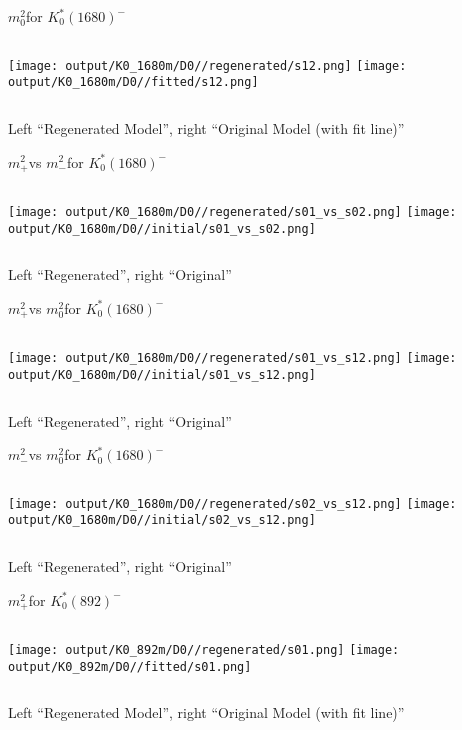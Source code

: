 \documentclass{beamer}
\newcommand{\MP}{\ensuremath{m^2_+}}
\newcommand{\MM}{\ensuremath{m^2_-}}
\newcommand{\MZ}{\ensuremath{m^2_0}}
\begin{document}
\begin{frame}{\MZ for $K_0^*(1680)^-$}
\begin{columns}[t]
\centering
\texttt{[image: output/K0\_1680m/D0//regenerated/s12.png]}
\centering
\texttt{[image: output/K0\_1680m/D0//fitted/s12.png]}
\end{columns}
    \centering
    Left ``Regenerated Model'', right ``Original Model (with fit line)''
\end{frame}                   


\begin{frame}{\MP vs \MM for $K_0^*(1680)^-$}
\begin{columns}[t]
\centering
\texttt{[image: output/K0\_1680m/D0//regenerated/s01\_vs\_s02.png]}
\centering
\texttt{[image: output/K0\_1680m/D0//initial/s01\_vs\_s02.png]}
\end{columns}
    \centering
    Left ``Regenerated'', right ``Original''
\end{frame} 


\begin{frame}{\MP vs \MZ for $K_0^*(1680)^-$}
\begin{columns}[t]
\centering
\texttt{[image: output/K0\_1680m/D0//regenerated/s01\_vs\_s12.png]}
\centering
\texttt{[image: output/K0\_1680m/D0//initial/s01\_vs\_s12.png]}
\end{columns}
    \centering
    Left ``Regenerated'', right ``Original''
\end{frame} 


\begin{frame}{\MM vs \MZ for $K_0^*(1680)^-$}
\begin{columns}[t]
\centering
\texttt{[image: output/K0\_1680m/D0//regenerated/s02\_vs\_s12.png]}
\centering
\texttt{[image: output/K0\_1680m/D0//initial/s02\_vs\_s12.png]}
\end{columns}
    \centering
    Left ``Regenerated'', right ``Original''
\end{frame} 

\begin{frame}{\MP for $K_0^*(892)^-$}
\begin{columns}[t]
\centering
\texttt{[image: output/K0\_892m/D0//regenerated/s01.png]}
\centering
\texttt{[image: output/K0\_892m/D0//fitted/s01.png]}
\end{columns}
    \centering
    Left ``Regenerated Model'', right ``Original Model (with fit line)''
\end{frame}                   
\end{document}
